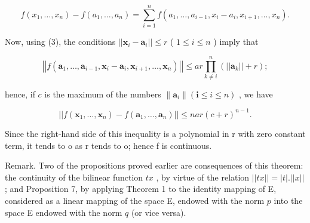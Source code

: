 \[
f \left(x _ {1}, \dots , x _ {n}\right) - f \left(a _ {1}, \dots , a _ {n}\right) = \sum_ {i = 1} ^ {n} f \left(a _ {1}, \dots , a _ {i - 1}, x _ {i} - a _ {i}, x _ {i + 1}, \dots , x _ {n}\right).
\]

Now, using (3), the conditions \(||\pmb{x}_i - \pmb{a}_i|| \leqslant r\) ( \(1 \leqslant i \leqslant n\) ) imply that

\[
\left| \left| f \left(\boldsymbol {a} _ {1}, \dots , \boldsymbol {a} _ {i - 1}, \boldsymbol {x} _ {i} - \boldsymbol {a} _ {i}, \boldsymbol {x} _ {i + 1}, \dots , \boldsymbol {x} _ {n}\right) \right| \right| \leqslant a r \prod_ {k \neq i} ^ {n} \left(\left| \left| \boldsymbol {a} _ {k} \right| \right| + r\right);
\]

hence, if \(c\) is the maximum of the numbers \(\| \pmb{a}_i \| (\mathbf{i} \leqslant i \leqslant n)\) , we have

\[
\left| \left| f \left(\boldsymbol {x} _ {1}, \dots , \boldsymbol {x} _ {n}\right) - f \left(\boldsymbol {a} _ {1}, \dots , \boldsymbol {a} _ {n}\right) \right| \right| \leqslant n a r (c + r) ^ {n - 1}.
\]

Since the right-hand side of this inequality is a polynomial in r with zero constant term, it tends to o as r tends to o; hence f is continuous.

Remark. Two of the propositions proved earlier are consequences of this theorem: the continuity of the bilinear function \(tx\) , by virtue of the relation \(||tx|| = |t|.||x||\) ; and Proposition 7, by applying Theorem 1 to the identity mapping of E, considered as a linear mapping of the space E, endowed with the norm \(p\) into the space E endowed with the norm \(q\) (or vice versa).


